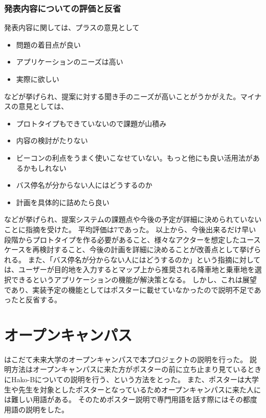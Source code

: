 \documentclass[openany,11pt,papersize]{jsbook}
\begin{document}
\subsubsection{発表内容についての評価と反省}
発表内容に関しては、プラスの意見として
\begin{itemize}

\item 問題の着目点が良い
\item アプリケーションのニーズは高い
\item 実際に欲しい

\end{itemize}
などが挙げられ、提案に対する聞き手のニーズが高いことがうかがえた。マイナスの意見としては、
\begin{itemize}

\item プロトタイプもできていないので課題が山積み
\item 内容の検討がたりない
\item ビーコンの利点をうまく使いこなせていない。もっと他にも良い活用法があるかもしれない
\item バス停名が分からない人にはどうするのか
\item 計画を具体的に詰めたら良い

\end{itemize}
などが挙げられ、提案システムの課題点や今後の予定が詳細に決められていないことに指摘を受けた。
平均評価は7であった。
以上から、今後出来るだけ早い段階からプロトタイプを作る必要があること、様々なアクターを想定したユースケースを再検討すること、今後の計画を詳細に決めることが改善点として挙げられる。
また、「バス停名が分からない人にはどうするのか」という指摘に対しては、ユーザーが目的地を入力するとマップ上から推奨される降車地と乗車地を選択できるというアプリケーションの機能が解決策となる。
しかし、これは展望であり、実装予定の機能としてはポスターに載せていなかったので説明不足であったと反省する。


\section{オープンキャンパス}
はこだて未来大学のオープンキャンパスで本プロジェクトの説明を行った。
説明方法はオープンキャンパスに来た方がポスターの前に立ち止まり見ているときにHako-Bについての説明を行う、という方法をとった。
また、ポスターは大学生や先生を対象としたポスターとなっているためオープンキャンパスに来た人には難しい用語がある。
そのためポスター説明で専門用語を話す際にはその都度用語の説明をした。
\end{document}
